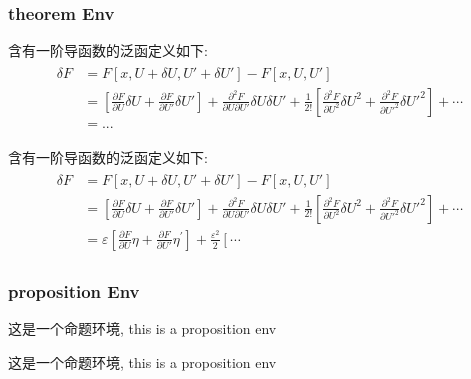 \subsubsection{theorem Env}
\begin{bytes}[10]
\begin{theorem}
    含有一阶导函数的泛函定义如下:
    \begin{align}
        \begin{aligned}
            \delta F
            & = F[x,U+\delta U,U'+\delta U']-F[x,U,U']  \\
            & = \left[\frac{\partial F}{\partial U}\delta U+\frac{\partial F}{\partial U'}\delta U'\right]+\frac{\partial^2F}{\partial U\partial U'}\delta U\delta U'+\frac{1}{2!}\left[\frac{\partial^2F}{\partial U^2}\delta U^2+\frac{\partial^2F}{\partial U'^2}\delta U'^2\right]+\cdots \\
            & = ...
        \end{aligned}
    \end{align}
\end{theorem}
\end{bytes}
\begin{theorem}
含有一阶导函数的泛函定义如下:
\begin{align}
    \begin{aligned}
        \delta F
        & = F[x,U+\delta U,U'+\delta U']-F[x,U,U']  \\
        & = \left[\frac{\partial F}{\partial U}\delta U+\frac{\partial F}{\partial U'}\delta U'\right]+\frac{\partial^2F}{\partial U\partial U'}\delta U\delta U'+\frac{1}{2!}\left[\frac{\partial^2F}{\partial U^2}\delta U^2+\frac{\partial^2F}{\partial U'^2}\delta U'^2\right]+\cdots \\
        & =\varepsilon\left[\frac{\partial F}{\partial U}\eta+\frac{\partial F}{\partial U'}\eta^{\prime}\right]+\frac{\varepsilon^{2}}{2}\left[\cdots\right.
    \end{aligned}
\end{align}
\end{theorem}

\subsubsection{proposition Env}
\begin{bytes}[10]
\begin{proposition}[某命题]
    这是一个命题环境, this is a proposition env
\end{proposition}
\end{bytes}
\begin{proposition}[某命题]
    这是一个命题环境, this is a proposition env
\end{proposition}

